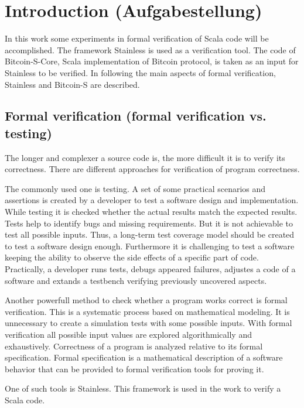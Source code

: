 \chapter{Introduction (Aufgabestellung)}
\label{chap:introduction}

In this work some experiments in formal verification of Scala code will be accomplished. 
The framework Stainless is used as a verification tool. The code of Bitcoin-S-Core, Scala implementation of Bitcoin protocol, is taken as an input for Stainless to be verified. 
In following the main aspects of formal verification, Stainless and Bitcoin-S are described.


\section{Formal verification (formal verification vs. testing)}
\label{sec:formal_verification}

The longer and complexer a source code is, the more difficult it is to verify its correctness.
There are different approaches for verification of program correctness. 

The commonly used one is testing. A set of some practical scenarios and assertions is created by a developer to test a software design and implementation. 
While testing it is checked whether the actual results match the expected results. Tests help to identify bugs and missing requirements.
But it is not achievable to test all possible inputs. 
Thus, a long-term test coverage model should be created to test a software design enough.
Furthermore it is challenging to test a software keeping the ability to observe the side effects of a specific part of code.
Practically, a developer runs tests, debugs appeared failures, adjustes a code of a software and extands a testbench verifying previously uncovered aspects. \cite{sanghavi:formal_verification}

Another powerfull method to check whether a program works correct is formal verification. 
This is a systematic process based on mathematical modeling. 
It is unnecessary to create a simulation tests with some possible inputs. 
With formal verification all possible input values are explored algorithmically and exhaustively.
Correctness of a program is analyzed relative to its formal specification.
Formal specification is a mathematical description of a software behavior that can be provided to formal verification tools for proving it. \cite{sanghavi:formal_verification}

One of such tools is Stainless. This framework is used in the work to verify a Scala code.


